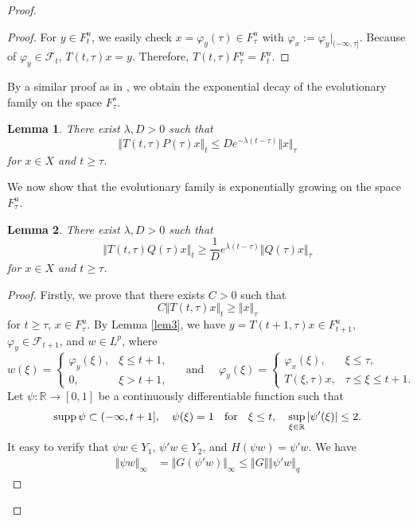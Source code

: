 \documentclass[reqno]{amsart}
\newtheorem{lemma}{Lemma}[section]
\def\r{\mathbb{R}}
\begin{document}
\begin{proof}
\begin{proof}
For $y\in F^{u}_t$, we easily check $x=\varphi_{y}(\tau) \in F^{u}_{\tau}$ with $\varphi_x := \varphi_{y}|_{(-\infty, \tau]}$. 
Because of $\varphi_y \in \mathcal{F}_t$,  $T(t, \tau)x = y$.
Therefore, $T(t,\tau) F^{u}_{\tau} = F^{u}_t$.
\end{proof}
By a similar proof as in \cite[Lemma 8]{14}, we obtain the exponential decay of the evolutionary family on the space $F_{\tau}^s$.
\begin{lemma}
There exist $\lambda , D>0 $ such that
\begin{equation*}
\Vert T(t,\tau)P(\tau)x\Vert_t \leq De^{-\lambda(t-\tau)}\Vert x\Vert_\tau  %
\end{equation*}
 for $x \in X$ and $t \geq \tau$.
\end{lemma}
We now show that the evolutionary family is exponentially growing on the space $F_{\tau}^u$.
\begin{lemma}\label{lem4}
There exist $\lambda , D>0 $ such that 
\begin{equation}
\Vert T(t,\tau)Q(\tau)x\Vert _t \geq \frac{1}{D} e^{\lambda(t-\tau)}\Vert Q(\tau)x\Vert _\tau \label{2.21}
\end{equation}
 for $x \in X$ and $t \geq \tau$.
\end{lemma}
\begin{proof}
Firstly, we prove that there exists $C>0$ such that 
\begin{equation}
C\Vert T(t,\tau)x \Vert _t \geq \Vert x\Vert _{\tau} \label{2.22}
\end{equation}
 for $t\geq \tau, \,x \in F^u_{\tau}$. By Lemma \ref{lem3}, we have $y=T(t+1,\tau)x \in F^u_{t+1}$, $\varphi_y \in \mathcal{F}_{t+1}$, and $w\in L^p$, where
$$ 
w(\xi)=
\begin{cases}
\varphi_y(\xi),& \xi \le t+1,\\
0,& \xi > t+1,
\end{cases}
\quad \text{ and } \quad
\varphi_y (\xi)=
\begin{cases}
\varphi_x(\xi),& \xi \le \tau,\\
T(\xi, \tau)x,& \tau \le \xi  \le t+1.
\end{cases}
 $$
Let $\psi:\r\to [0,1]$  be a continuously differentiable function such that
$$ {\rm supp \,} \psi \subset (-\infty, t+1],\quad \psi(\xi)=1 \text{ \; for \; } \xi \le t,\quad \sup_{\xi \in \r}|\psi'(\xi)| \le 2. $$
It easy to verify that $\psi w \in Y_1$, $\psi' w \in Y_2$, and $H(\psi w)=\psi' w$. We have
 \begin{align*}
\Vert \psi w \Vert _{\infty}&=\Vert G(\psi' w )\Vert _{\infty} \leq \Vert G \Vert \Vert\psi' w \Vert _{q}

\end{align*}
\end{proof}
\end{proof}
\end{document}

